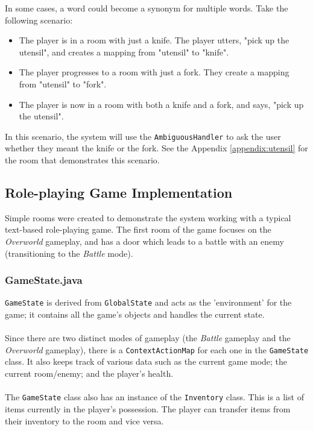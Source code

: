 \documentclass[11pt]{article}
\begin{document}
In some cases, a word could become a synonym for multiple words. Take the following scenario:

\begin{itemize}
\item The player is in a room with just a knife. The player utters, "pick up the utensil", and creates a mapping from "utensil" to "knife".

\item The player progresses to a room with just a fork. They create a mapping from "utensil" to "fork".

\item The player is now in a room with both a knife and a fork, and says, "pick up the utensil".
\end{itemize}

In this scenario, the system will use the \texttt{AmbiguousHandler} to ask the user whether they meant the knife or the fork. See the Appendix \ref{appendix:utensil} for the room that demonstrates this scenario.

\subsection{Role-playing Game Implementation}

Simple rooms were created to demonstrate the system working with a typical text-based role-playing game. The first room of the game focuses on the \textit{Overworld} gameplay, and has a door which leads to a battle with an enemy (transitioning to the \textit{Battle} mode).

\subsubsection{GameState.java}

\texttt{GameState} is derived from \texttt{GlobalState} and acts as the 'environment' for the game; it contains all the game's objects and handles the current state.
\\
\\
Since there are two distinct modes of gameplay (the \textit{Battle} gameplay and the \textit{Overworld} gameplay), there is a \texttt{ContextActionMap} for each one in the \texttt{GameState} class. It also keeps track of various data such as the current game mode; the current room/enemy; and the player's health.
\\
\\
The \texttt{GameState} class also has an instance of the \texttt{Inventory} class. This is a list of items currently in the player's possession. The player can transfer items from their inventory to the room and vice versa.
\end{document}
